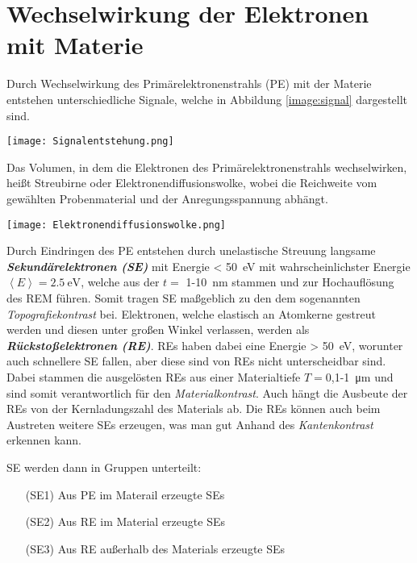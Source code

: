 \section{Wechselwirkung der Elektronen mit Materie}
\label{sec:elektrons}
Durch Wechselwirkung des Primärelektronenstrahls (PE) mit der Materie entstehen unterschiedliche Signale, welche in Abbildung \ref{image:signal} dargestellt sind.
\begin{center}
    \texttt{[image: Signalentstehung.png]}
    \label{image:signal}
\end{center}
Das Volumen, in dem die Elektronen des Primärelektronenstrahls wechselwirken, heißt Streubirne oder Elektronendiffusionswolke, wobei die Reichweite vom gewählten Probenmaterial und der Anregungsspannung abhängt. 
\begin{center}
    \texttt{[image: Elektronendiffusionswolke.png]}
    \label{image:wolke}
\end{center}
Durch Eindringen des PE entstehen durch unelastische Streuung langsame \textbf{\textit{Sekundärelektronen (SE)}} mit Energie < \SI{50}{\electronvolt} mit wahrscheinlichster Energie $\left\langle E\right\rangle=\SI{2,5}{\electronvolt}$, welche aus der $t =$ 1-\SI{10}{\nano\metre} stammen und zur Hochauflösung des REM führen. \citep{RasterEM} Somit tragen SE maßgeblich zu den dem sogenannten \textit{Topografiekontrast} bei. \citep{WikipolyREM} Elektronen, welche elastisch an Atomkerne gestreut werden und diesen unter großen Winkel verlassen, werden als \textbf{\textit{Rückstoßelektronen (RE)}}. REs haben dabei eine Energie > \SI{50}{\electronvolt}, worunter auch schnellere SE fallen, aber diese sind von REs nicht unterscheidbar sind. Dabei stammen die ausgelösten REs aus einer Materialtiefe $T=$0,1-\SI{1}{\micro\metre} und sind somit verantwortlich für den \textit{Materialkontrast}. Auch hängt die Ausbeute der REs von der Kernladungszahl des Materials ab. \citep{RasterEM} \citep{WikipolyREM} Die REs können auch beim Austreten weitere SEs erzeugen, was man gut Anhand des \textit{Kantenkontrast} erkennen kann. \citep{RasterEM} 

SE werden dann in Gruppen unterteilt:
\begin{itemize}
    \item[(SE1)] Aus PE im Materail erzeugte SEs
    \item[(SE2)] Aus RE im Material erzeugte SEs 
    \item[(SE3)] Aus RE außerhalb des Materials erzeugte SEs   
\end{itemize}

